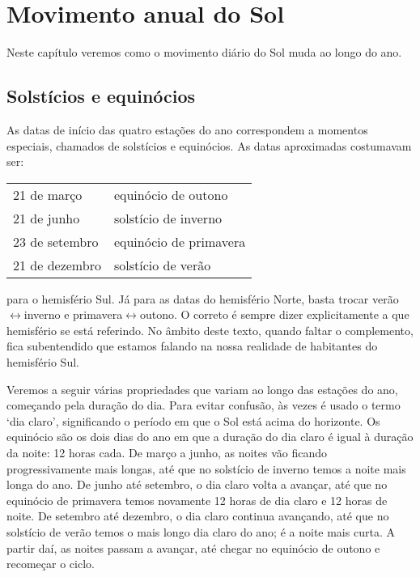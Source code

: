 \chapter{Movimento anual do Sol}

Neste capítulo veremos como o movimento diário do Sol muda ao longo do ano.
 
\section{Solstícios e equinócios}

As datas de início das quatro estações do ano correspondem a momentos especiais, chamados de solstícios e equinócios. As datas aproximadas costumavam ser:

\begin{center}
\begin{tabular}{ll}
\hline
21 de março & equinócio de outono \\
21 de junho & solstício de inverno  \\
23 de setembro & equinócio de primavera \\
21 de dezembro & solstício de verão \\
\hline
\end{tabular}
\end{center}

\noindent para o hemisfério Sul. Já para as datas do hemisfério Norte, basta trocar verão$\leftrightarrow$inverno e primavera$\leftrightarrow$outono. O correto é sempre dizer explicitamente a que hemisfério se está referindo. No âmbito deste texto, quando faltar o complemento, fica subentendido que estamos falando na nossa realidade de habitantes do hemisfério Sul.

Veremos a seguir várias propriedades que variam ao longo das estações do ano, começando pela duração do dia. Para evitar confusão, às vezes é usado o termo `dia claro', significando o período em que o Sol está acima do horizonte. Os equinócio são os dois dias do ano em que a duração do dia claro é igual à duração da noite: 12 horas cada. De março a junho, as noites vão ficando progressivamente mais longas, até que no solstício de inverno temos a noite mais longa do ano. De junho até setembro, o dia claro volta a avançar, até que no equinócio de primavera temos novamente 12 horas de dia claro e 12 horas de noite. De setembro até dezembro, o dia claro continua avançando, até que no solstício de verão temos o mais longo dia claro do ano; é a noite mais curta. A partir daí, as noites passam a avançar, até chegar no equinócio de outono e recomeçar o ciclo.

